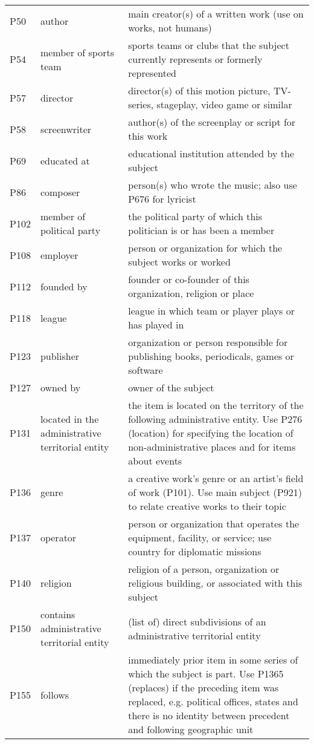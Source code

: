 \documentclass[11pt,a4paper]{article}
\begin{document}
\begin{table*}[htp]
{\begin{tabular}{p{} | p{} | p{}}
P50 & author & main creator(s) of a written work (use on works, not humans) \\
P54 & member of sports team & sports teams or clubs that the subject currently represents or formerly represented \\
P57 & director & director(s) of this motion picture, TV-series, stageplay, video game or similar \\
P58 & screenwriter & author(s) of the screenplay or script for this work \\
P69 & educated at & educational institution attended by the subject \\
P86 & composer & person(s) who wrote the music; also use P676 for lyricist \\
P102 & member of political party & the political party of which this politician is or has been a member \\
P108 & employer & person or organization for which the subject works or worked \\
P112 & founded by & founder or co-founder of this organization, religion or place \\
P118 & league & league in which team or player plays or has played in \\
P123 & publisher & organization or person responsible for publishing books, periodicals, games or software \\
P127 & owned by & owner of the subject \\
P131 & located in the administrative territorial entity & the item is located on the territory of the following administrative entity. Use P276 (location) for specifying the location of non-administrative places and for items about events \\
P136 & genre & a creative work's genre or an artist's field of work (P101). Use main subject (P921) to relate creative works to their topic \\
P137 & operator & person or organization that operates the equipment, facility, or service; use country for diplomatic missions \\
P140 & religion & religion of a person, organization or religious building, or associated with this subject \\
P150 & contains administrative territorial entity & (list of) direct subdivisions of an administrative territorial entity \\
P155 & follows & immediately prior item in some series of which the subject is part. Use P1365 (replaces) if the preceding item was replaced, e.g. political offices, states and there is no identity between precedent and following geographic unit \\

\end{tabular}}
\end{table*}
\end{document}
